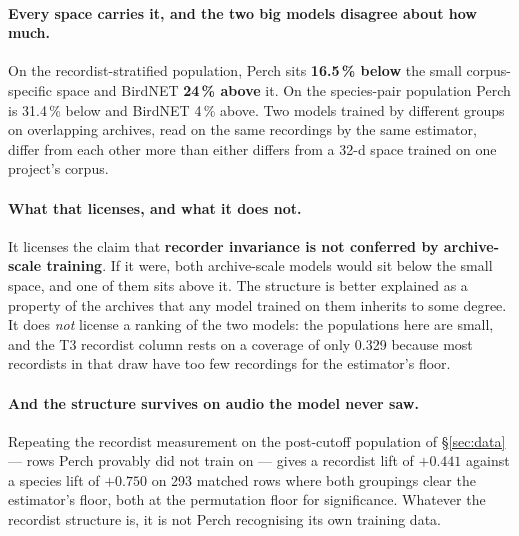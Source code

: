 \documentclass[10pt,twocolumn,a4paper]{article}
\begin{document}
\paragraph{Every space carries it, and the two big models disagree about how much.} On the
recordist-stratified population, Perch sits \textbf{16.5\,\% below} the small
corpus-specific space and BirdNET \textbf{24\,\% above} it. On the species-pair population
Perch is 31.4\,\% below and BirdNET 4\,\% above. Two models trained by different groups on
overlapping archives, read on the same recordings by the same estimator, differ from each
other more than either differs from a 32-d space trained on one project's corpus.

\paragraph{What that licenses, and what it does not.} It licenses the claim that
\textbf{recorder invariance is not conferred by archive-scale training}. If it were, both
archive-scale models would sit below the small space, and one of them sits above it. The
structure is better explained as a property of the archives that any model trained on them
inherits to some degree. It does \emph{not} license a ranking of the two models: the
populations here are small, and the T3 recordist column rests on a coverage of only 0.329
because most recordists in that draw have too few recordings for the estimator's floor.

\paragraph{And the structure survives on audio the model never saw.} Repeating the
recordist measurement on the post-cutoff population of \S\ref{sec:data} --- rows Perch
provably did not train on --- gives a recordist lift of $+0.441$ against a species lift of
$+0.750$ on 293 matched rows where both groupings clear the estimator's floor, both at the
permutation floor for significance. Whatever the recordist structure is, it is not Perch
recognising its own training data.
\end{document}

